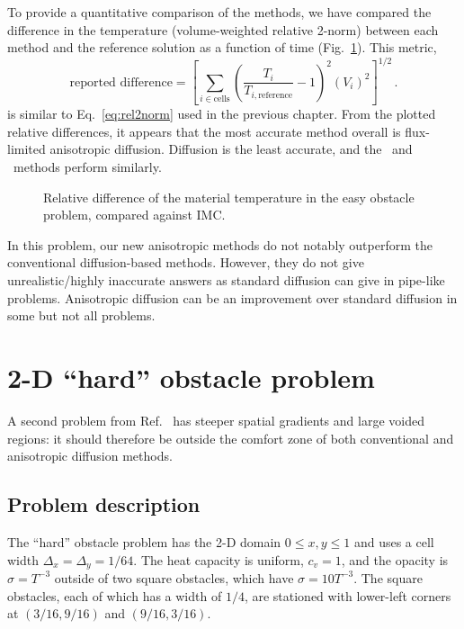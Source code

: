 To provide a quantitative comparison of the
methods, we have compared the difference in the temperature (volume-weighted
relative 2-norm) between each method and the reference solution as a function of
time (Fig.~\ref{fig:easymkConvergence}).
This metric,
\begin{equation*}
  \text{reported difference} =
  \left[ \sum_{i \in \text{cells}} \left(
  \frac{T_i}{T_{i,\text{reference}}} - 1 \right)^2 (V_i)^2\right]^{1/2} \,.
\end{equation*}
is similar to Eq.~\eqref{eq:rel2norm} used in the previous chapter.
From the plotted relative differences, it appears that the most accurate method
overall is flux-limited anisotropic diffusion. Diffusion is the least accurate,
and the \APone\ and \Pone\ methods perform similarly.

\begin{figure}[htb]
  \centering
  
  \caption{Relative difference of the material temperature in the easy obstacle
  problem, compared against IMC.}
  \label{fig:easymkConvergence}
\end{figure}

In this problem, our new anisotropic methods do not notably outperform the
conventional diffusion-based methods. However, they do not give
unrealistic/highly inaccurate answers as standard diffusion can give in
pipe-like problems. Anisotropic diffusion can be an improvement over standard
diffusion in some but not all problems.

\clearpage
\section{2-D \texorpdfstring{``hard''}{hard} obstacle problem}

A second problem from Ref.~\cite{Mou2006} has steeper spatial gradients and
large voided regions: it should therefore be outside the comfort zone of
both conventional and anisotropic diffusion methods.

\subsection{Problem description}

The ``hard'' obstacle problem has the 2-D domain $0 \le x,y \le 1$ and uses a
cell width $\Delta_x=\Delta_y=1/64$. The heat capacity is uniform, $c_v=1$, and
the opacity is $\sigma=T^{-3}$ outside of two square obstacles, which have
$\sigma=10 T^{-3}$. The square obstacles, each of which has a width of $1/4$, are
stationed with lower-left corners at $(3/16, 9/16)$ and $(9/16,3/16)$.

